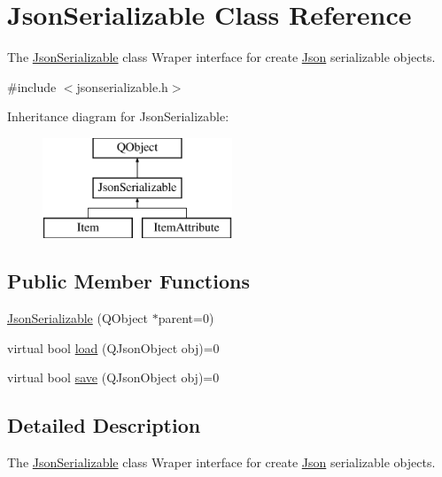\hypertarget{class_json_serializable}{}\section{Json\+Serializable Class Reference}
\label{class_json_serializable}


The \hyperlink{class_json_serializable}{Json\+Serializable} class Wraper interface for create \hyperlink{namespace_json}{Json} serializable objects.  




{\ttfamily \#include $<$jsonserializable.\+h$>$}

Inheritance diagram for Json\+Serializable\+:\begin{figure}[H]
\begin{center}
\leavevmode
\includegraphics[height=3.000000cm]{class_json_serializable}
\end{center}
\end{figure}
\subsection*{Public Member Functions}
\begin{DoxyCompactItemize}
\item 
\hyperlink{class_json_serializable_ab5bc08152c95bca5aad8f1a4e2c09998}{Json\+Serializable} (Q\+Object $\ast$parent=0)
\item 
virtual bool \hyperlink{class_json_serializable_a881aaead36cbf7d097bddfa08f204fd9}{load} (Q\+Json\+Object obj)=0
\item 
virtual bool \hyperlink{class_json_serializable_a98939816a5704c8d4c46f8571a5ae214}{save} (Q\+Json\+Object obj)=0
\end{DoxyCompactItemize}


\subsection{Detailed Description}
The \hyperlink{class_json_serializable}{Json\+Serializable} class Wraper interface for create \hyperlink{namespace_json}{Json} serializable objects. 

